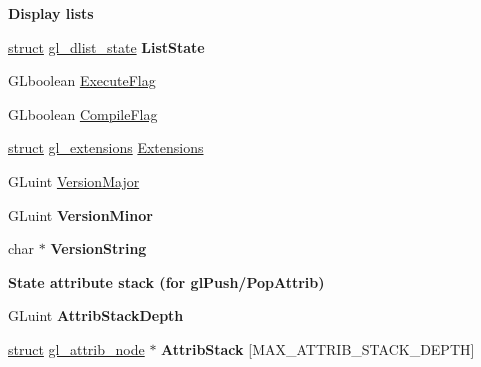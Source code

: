 \begin{Indent}\textbf{ Display lists}\par
\begin{DoxyCompactItemize}
\item 
\mbox{\label{structgl__context_a2e364570cee504dd9924b1dd32f484ae}} 
\hyperlink{interfacestruct}{struct} \hyperlink{structgl__dlist__state}{gl\+\_\+dlist\+\_\+state} {\bfseries List\+State}
\item 
G\+Lboolean \hyperlink{structgl__context_a492432e836190b7addd4771e0e9cfbfe}{Execute\+Flag}
\item 
G\+Lboolean \hyperlink{structgl__context_a61c2ececfb345ad84ed3e53b6e61fc91}{Compile\+Flag}
\item 
\hyperlink{interfacestruct}{struct} \hyperlink{structgl__extensions}{gl\+\_\+extensions} \hyperlink{structgl__context_a42c593ad4789f858c99817c631137507}{Extensions}
\item 
G\+Luint \hyperlink{structgl__context_aa41cddcbdb50f005d485615064e0ab2a}{Version\+Major}
\item 
\mbox{\label{structgl__context_ae66d3dbeab0af709a5c4de0d11039f97}} 
G\+Luint {\bfseries Version\+Minor}
\item 
\mbox{\label{structgl__context_a9f7f192bfa182237d736243e484a9ab6}} 
char $\ast$ {\bfseries Version\+String}
\end{DoxyCompactItemize}
\end{Indent}
\begin{Indent}\textbf{ State attribute stack (for gl\+Push/\+Pop\+Attrib)}\par
\begin{DoxyCompactItemize}
\item 
\mbox{\label{structgl__context_acb5e9af9fa07547bfa08afdf1bc18e65}} 
G\+Luint {\bfseries Attrib\+Stack\+Depth}
\item 
\mbox{\label{structgl__context_af340afb7885ac134682183a277ccb4f6}} 
\hyperlink{interfacestruct}{struct} \hyperlink{structgl__attrib__node}{gl\+\_\+attrib\+\_\+node} $\ast$ {\bfseries Attrib\+Stack} \mbox{[}M\+A\+X\+\_\+\+A\+T\+T\+R\+I\+B\+\_\+\+S\+T\+A\+C\+K\+\_\+\+D\+E\+P\+TH\mbox{]}
\end{DoxyCompactItemize}
\end{Indent}
